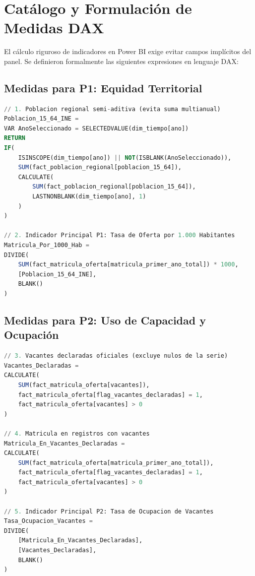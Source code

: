 \documentclass[11pt,a4paper]{article}
\begin{document}
\section{Catálogo y Formulación de Medidas DAX}

El cálculo riguroso de indicadores en Power BI exige evitar campos implícitos del panel. Se definieron formalmente las siguientes expresiones en lenguaje DAX:

\subsection{Medidas para P1: Equidad Territorial}
\begin{lstlisting}[language=SQL, caption={Cálculo de Población Regional y Tasa de Oferta por 1.000 Habitantes (DAX)}]
// 1. Poblacion regional semi-aditiva (evita suma multianual)
Poblacion_15_64_INE = 
VAR AnoSeleccionado = SELECTEDVALUE(dim_tiempo[ano])
RETURN
IF(
    ISINSCOPE(dim_tiempo[ano]) || NOT(ISBLANK(AnoSeleccionado)),
    SUM(fact_poblacion_regional[poblacion_15_64]),
    CALCULATE(
        SUM(fact_poblacion_regional[poblacion_15_64]),
        LASTNONBLANK(dim_tiempo[ano], 1)
    )
)

// 2. Indicador Principal P1: Tasa de Oferta por 1.000 Habitantes
Matricula_Por_1000_Hab = 
DIVIDE(
    SUM(fact_matricula_oferta[matricula_primer_ano_total]) * 1000,
    [Poblacion_15_64_INE],
    BLANK()
)
\end{lstlisting}

\subsection{Medidas para P2: Uso de Capacidad y Ocupación}
\begin{lstlisting}[language=SQL, caption={Cálculo de Vacantes Declaradas y Tasa de Ocupación Segura (DAX)}]
// 3. Vacantes declaradas oficiales (excluye nulos de la serie)
Vacantes_Declaradas = 
CALCULATE(
    SUM(fact_matricula_oferta[vacantes]),
    fact_matricula_oferta[flag_vacantes_declaradas] = 1,
    fact_matricula_oferta[vacantes] > 0
)

// 4. Matricula en registros con vacantes
Matricula_En_Vacantes_Declaradas = 
CALCULATE(
    SUM(fact_matricula_oferta[matricula_primer_ano_total]),
    fact_matricula_oferta[flag_vacantes_declaradas] = 1,
    fact_matricula_oferta[vacantes] > 0
)

// 5. Indicador Principal P2: Tasa de Ocupacion de Vacantes
Tasa_Ocupacion_Vacantes = 
DIVIDE(
    [Matricula_En_Vacantes_Declaradas],
    [Vacantes_Declaradas],
    BLANK()
)
\end{lstlisting}
\end{document}
